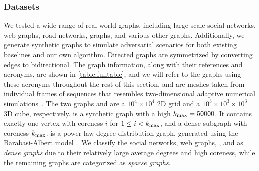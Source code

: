 \subsubsection{Datasets}\label{sec:datasets}
We tested a wide range of real-world graphs, including large-scale social networks, web graphs, 
road networks, \knn{} graphs, and various other graphs.
Additionally, we generate synthetic graphs to simulate adversarial scenarios for both existing baselines and our own algorithm. 
Directed graphs are symmetrized by converting edges to bidirectional.
The graph information, along with their references and acronyms, are shown in \cref{table:fulltable}, 
and we will refer to the graphs using these acronyms throughout the rest of this section.
\TRCE and \BBL are meshes taken from individual frames of sequences that resembles two-dimensional adaptive numerical simulations~\cite{nr}.
The two graphs \GRD{} and \CBC{} are a $10^4 \times 10^4$ 2D grid and a $10^3 \times 10^3 \times 10^3$ 3D cube, respectively.
\HCNS{} is a synthetic graph with a high ${k_{\max}}=50000$. 
It contains exactly one vertex with coreness $i$ for $1\le i<k_{\max}$, and a dense subgraph with coreness ${k_{\max}}$.  %
\HPL{} is a power-law degree distribution graph, generated using the Barabasi-Albert model~\cite{barabasi1999emergence}.
We classify the social networks, web graphs, \HCNS{}, and \HPL{} as \emph{dense graphs} due to their relatively large average degrees and high coreness, 
while the remaining graphs are categorized as \emph{sparse graphs}.



